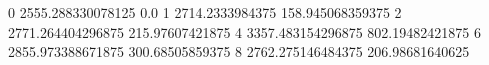 0 2555.288330078125 0.0
1 2714.2333984375 158.945068359375
2 2771.264404296875 215.97607421875
4 3357.483154296875 802.19482421875
6 2855.973388671875 300.68505859375
8 2762.275146484375 206.98681640625
